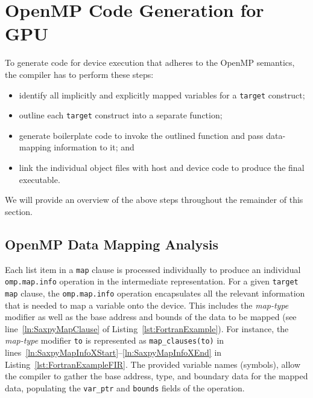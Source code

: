 \documentclass[acmtog,natbib=false]{acmart}
\newcommand{\code}[1]{\texttt{#1}\xspace}
\begin{document}

\section{OpenMP Code Generation for GPU}
\label{sec:OpenMPCodeGen}

To generate code for device execution that adheres to the OpenMP semantics, the compiler has to perform these steps:

\begin{itemize}
\item identify all implicitly and explicitly mapped variables for a \code{target} construct;
\item outline each \code{target} construct into a separate function;
\item generate boilerplate code to invoke the outlined function and pass data-mapping information to it; and
\item link the individual object files with host and device code to produce the final executable.
\end{itemize}

We will provide an overview of the above steps throughout the remainder of this section.

\subsection{OpenMP Data Mapping Analysis}
\label{sec:OpenMPDataMappingAnalysis}

Each list item in a \code{map} clause is processed individually to produce an individual \code{omp.map.info} operation in the intermediate representation. 
For a given \code{target} \code{map} clause, the \code{omp.map.info} operation encapsulates all the relevant information that is needed to map a variable onto the device.
This includes the \textit{map-type} modifier as well as the base address and bounds of the data to be mapped (see line~\ref{ln:SaxpyMapClause} of Listing~\ref{lst:FortranExample}).
For instance, the \textit{map-type} modifier \code{to} is represented as \code{map\_clauses(to)} in lines~\ref{ln:SaxpyMapInfoXStart}--\ref{ln:SaxpyMapInfoXEnd} in Listing~\ref{lst:FortranExampleFIR}.
The provided variable names (symbols), allow the compiler to gather the base address, type, and boundary data for the mapped data, populating the \code{var\_ptr} and \code{bounds} fields of the operation. 
\end{document}
